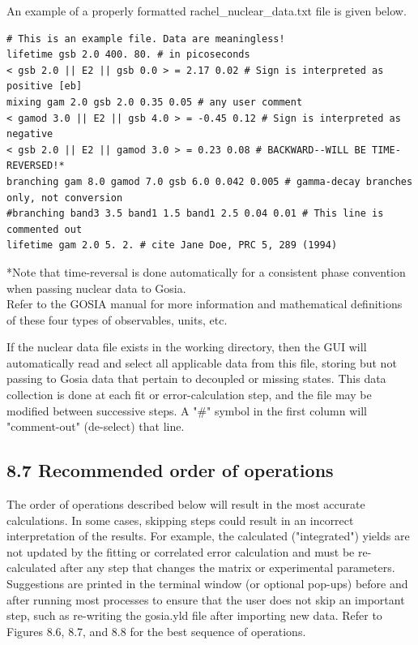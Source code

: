 \documentclass[10pt]{article}
\begin{document}
An example of a properly formatted rachel\_nuclear\_data.txt file is given below.

\begin{verbatim}
# This is an example file. Data are meaningless!
lifetime gsb 2.0 400. 80. # in picoseconds
< gsb 2.0 || E2 || gsb 0.0 > = 2.17 0.02 # Sign is interpreted as positive [eb]
mixing gam 2.0 gsb 2.0 0.35 0.05 # any user comment
< gamod 3.0 || E2 || gsb 4.0 > = -0.45 0.12 # Sign is interpreted as negative
< gsb 2.0 || E2 || gamod 3.0 > = 0.23 0.08 # BACKWARD--WILL BE TIME-REVERSED!*
branching gam 8.0 gamod 7.0 gsb 6.0 0.042 0.005 # gamma-decay branches only, not conversion
#branching band3 3.5 band1 1.5 band1 2.5 0.04 0.01 # This line is commented out
lifetime gam 2.0 5. 2. # cite Jane Doe, PRC 5, 289 (1994)
\end{verbatim}

*Note that time-reversal is done automatically for a consistent phase convention when passing nuclear data to Gosia.\\
Refer to the GOSIA manual for more information and mathematical definitions of these four types of observables, units, etc.

If the nuclear data file exists in the working directory, then the GUI will automatically read and select all applicable data from this file, storing but not passing to Gosia data that pertain to decoupled or missing states. This data collection is done at each fit or error-calculation step, and the file may be modified between successive steps. A "\#" symbol in the first column will "comment-out" (de-select) that line.

\subsection*{8.7 Recommended order of operations}
The order of operations described below will result in the most accurate calculations. In some cases, skipping steps could result in an incorrect interpretation of the results. For example, the calculated ("integrated") yields are not updated by the fitting or correlated error calculation and must be re-calculated after any step that changes the matrix or experimental parameters. Suggestions are printed in the terminal window (or optional pop-ups) before and after running most processes to ensure that the user does not skip an important step, such as re-writing the gosia.yld file after importing new data. Refer to Figures 8.6, 8.7, and 8.8 for the best sequence of operations.
\end{document}
